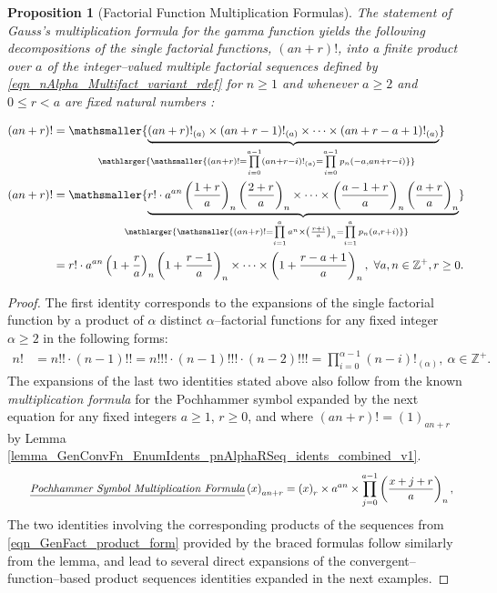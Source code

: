 \documentclass[12pt,reqno]{article}
\renewenvironment{subequations}{%
  \refstepcounter{equation}%
  \edef\theparentequation{\theequation}%
  \setcounter{parentequation}{\value{equation}}%
  \setcounter{equation}{0}%
  \def\theequation{\theparentequation.\alph{equation}}%
  \ignorespaces
}{%
  \setcounter{equation}{\value{parentequation}}%
  \ignorespacesafterend
}
\numberwithin{sfootnote}{section}
\numberwithin{equation}{section}
\newcommand{\tagtext}[1]{\tag*{\underline{\textit{#1}}}}
\theoremstyle{plain}
\newtheorem{prop}[theorem]{Proposition}
\theoremstyle{definition}
\theoremstyle{remark}
\newcommand{\undersetbrace}[2]{\ensuremath{\underset{\mathlarger{#1}}{\mathsmaller{\underbrace{#2}}}}}
\newcommand{\StartGroupingSubEquations}{\begin{subequations}}
\newcommand{\EndGroupingSubEquations}{\end{subequations}}
\newcommand{\Pochhammer}[2]{\ensuremath{\left(#1\right)_{#2}}}
\newcommand{\AlphaFactorial}[2]{\ensuremath{\left(#1\right)!_{\left(#2\right)}}}
\newcommand{\pn}[3]{\ensuremath{p_{#1}\left(#2, #3\right)}}
\begin{document}
\begin{prop}[Factorial Function Multiplication Formulas]
The statement of 
\emph{Gauss's multiplication formula} for the gamma function yields the 
following decompositions of the single factorial functions, $(an+r)!$, 
into a finite product over $a$ of the integer--valued multiple factorial 
sequences defined by \eqref{eqn_nAlpha_Multifact_variant_rdef} for 
$n \geq 1$ and whenever $a \geq 2$ and $0 \leq r < a$ 
are fixed natural numbers 
\citep[\S5.5(iii)]{NISTHB} \citep[\S 2]{ATLASOFFUNCTIONS} 
\citep{WOLFRAMFNSSITE-INTRO-FACTBINOMS}: 
\StartGroupingSubEquations 
\begin{align} 
(an+r)! & = 
     \undersetbrace{ \mathsmaller{(an+r)! = 
     \prod\limits_{i=0}^{a-1} \AlphaFactorial{an+r-i}{a} = 
     \prod\limits_{i=0}^{a-1} \pn{n}{-a}{an+r-i} }}{ 
     \AlphaFactorial{an+r}{a} \times \AlphaFactorial{an+r-1}{a} 
     \times \cdots \times 
     \AlphaFactorial{an+r-a+1}{a} 
     } \\ 
(an+r)! & = 
     \undersetbrace{ \mathsmaller{(an+r)! = 
     \prod\limits_{i=1}^{a} a^{n} \times \Pochhammer{\frac{r+i}{a}}{n} = 
     \prod\limits_{i=1}^{a} \pn{n}{a}{r+i} } }{ 
     r! \cdot a^{an} \Pochhammer{\frac{1+r}{a}}{n} 
     \Pochhammer{\frac{2+r}{a}}{n} \times \cdots \times 
     \Pochhammer{\frac{a-1+r}{a}}{n} 
     \Pochhammer{\frac{a+r}{a}}{n} 
     } \\ 
\notag 
     & = 
     r! \cdot a^{an} \Pochhammer{1+\frac{r}{a}}{n} 
     \Pochhammer{1+\frac{r-1}{a}}{n} \times \cdots \times 
     \Pochhammer{1+\frac{r-a+1}{a}}{n},\ 
     \forall a,n \in \mathbb{Z}^{+}, r \geq 0. 
\end{align} 
\EndGroupingSubEquations 
\end{prop} 
\begin{proof} 
The first identity corresponds to the expansions of the 
single factorial function by a product of $\alpha$ distinct 
$\alpha$--factorial functions for any fixed integer $\alpha \geq 2$ in the 
following forms: 
\begin{align*} 
n! & = n!! \cdot (n-1)!! = n!!! \cdot (n-1)!!! \cdot (n-2)!!! 
     = \prod_{i=0}^{\alpha-1} \AlphaFactorial{n-i}{\alpha},\ 
     \alpha \in \mathbb{Z}^{+}. 
\end{align*} 
The expansions of the last two identities stated above also follow from the 
known \emph{multiplication formula} for the Pochhammer symbol 
expanded by the next equation \citep{WOLFRAMFNSSITE-INTRO-FACTBINOMS} 
for any fixed integers $a \geq 1$, $r \geq 0$, and where 
$(an+r)! = \Pochhammer{1}{an+r}$ by 
Lemma \ref{lemma_GenConvFn_EnumIdents_pnAlphaRSeq_idents_combined_v1}. 
\begin{align*} 
\tagtext{Pochhammer Symbol Multiplication Formula} 
\Pochhammer{x}{an+r} & = 
     \Pochhammer{x}{r} \times a^{an} \times 
     \prod_{j=0}^{a-1} \Pochhammer{\frac{x+j+r}{a}}{n}, 
\end{align*} 
The two identities involving the corresponding products of the 
sequences from \eqref{eqn_GenFact_product_form} 
provided by the braced formulas follow similarly from the lemma, and 
lead to several direct expansions of the convergent--function--based 
product sequences identities expanded in the next examples. 
\end{proof} 
\end{document}
